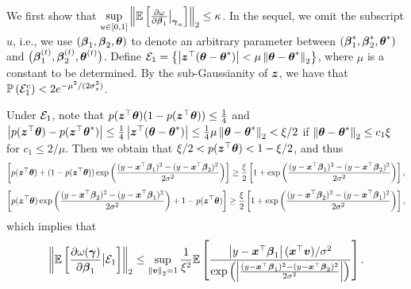We first show that $\sup\limits_{u \in [0, 1]}\left\lVert\mathbb{E}\left[\frac{\partial\omega}{\partial \boldsymbol{\beta}_1}\big|_{\boldsymbol{\gamma}_{u}}\right]\right\rVert_2 \leq \kappa$. In the sequel, we omit the subscript $u$, i.e., we use $(\boldsymbol{\beta}_1, \boldsymbol{\beta}_2, \boldsymbol{\theta})$ to denote an arbitrary parameter between $(\boldsymbol{\beta}_1^*, \boldsymbol{\beta}_2^*, \boldsymbol{\theta}^*)$ and $\big(\boldsymbol{\beta}_1^{(t)}, \boldsymbol{\beta}_2^{(t)}, \boldsymbol{\theta}^{(t)}\big)$. Define ${\cal E}_1= \left\{ \left\lvert\boldsymbol{z}^{\top}(\boldsymbol{\theta}-\boldsymbol{\theta}^*)\right\rvert<\mu\left\lVert\boldsymbol{\theta}-\boldsymbol{\theta}^*\right\rVert_2 \right\}$, where $\mu$ is a constant to be determined. By the sub-Gaussianity of $\boldsymbol{z}$, we have that $\mathbb{P}\left( {\cal E}_1^c \right) < 2e^{-\mu^2/(2\sigma_z^2)}$. 

Under ${\cal E}_1$, note that $p(\boldsymbol{z}^{\top}\boldsymbol{\theta})(1-p(\boldsymbol{z}^{\top}\boldsymbol{\theta})) \leq \frac{1}{4}$ and $\left\lvert p(\boldsymbol{z}^{\top}\boldsymbol{\theta})-p(\boldsymbol{z}^{\top}\boldsymbol{\theta}^*)\right\rvert \leq \frac{1}{4}\left\lvert\boldsymbol{z}^{\top}(\boldsymbol{\theta}-\boldsymbol{\theta}^*)\right\rvert \leq  \frac{1}{4}\mu\left\lVert\boldsymbol{\theta}-\boldsymbol{\theta}^*\right\rVert_2<\xi/2$ if $\left\lVert\boldsymbol{\theta}-\boldsymbol{\theta}^*\right\rVert_2 \leq  c_1\xi$ for $c_1 \leq 2/\mu$. Then we obtain that $\xi/2 <p(\boldsymbol{z}^{\top}\boldsymbol{\theta}) < 1-\xi/2$, and thus \[\left[p(\boldsymbol{z}^\top\boldsymbol{\theta})+(1-p(\boldsymbol{z}^\top\boldsymbol{\theta}))\exp\left(\frac{(y-\boldsymbol{x}^{\top}\boldsymbol{\beta}_1)^2-(y-\boldsymbol{x}^{\top}\boldsymbol{\beta}_2)^2}{2\sigma^2}\right)\right] \geq \frac{\xi}{2}\left[ 1+ \exp\left(\frac{(y-\boldsymbol{x}^{\top}\boldsymbol{\beta}_1)^2-(y-\boldsymbol{x}^{\top}\boldsymbol{\beta}_2)^2}{2\sigma^2}\right) \right],\]
	\[\left[p(\boldsymbol{z}^\top\boldsymbol{\theta})\exp\left(\frac{(y-\boldsymbol{x}^{\top}\boldsymbol{\beta}_2)^2-(y-\boldsymbol{x}^{\top}\boldsymbol{\beta}_1)^2}{2\sigma^2}\right)+1-p(\boldsymbol{z}^\top\boldsymbol{\theta})\right]\geq \frac{\xi}{2}\left[ 1+ \exp\left(\frac{(y-\boldsymbol{x}^{\top}\boldsymbol{\beta}_2)^2-(y-\boldsymbol{x}^{\top}\boldsymbol{\beta}_1)^2}{2\sigma^2}\right) \right],\]
which implies that
\begin{equation}
	\label{eq:E-partial-oemga-1}
	\norm{\EE\left[\frac{\partial\omega(\bgamma)}{\partial \bbeta_1} \big| \cE_1 \right]}_2 \leq \sup\limits_{\norm{\bv}_2=1}\frac{1}{\xi^2}\EE\brackets{\frac{\abs{y-\bx^{\top}\bbeta_1}(\bx^{\top}\bv)/\sigma^2}{\exp\paren{\abs{\frac{(y-\bx^{\top}\bbeta_1)^2-(y-\bx^{\top}\bbeta_2)^2}{2\sigma^2}}}}} .
	\end{equation}

